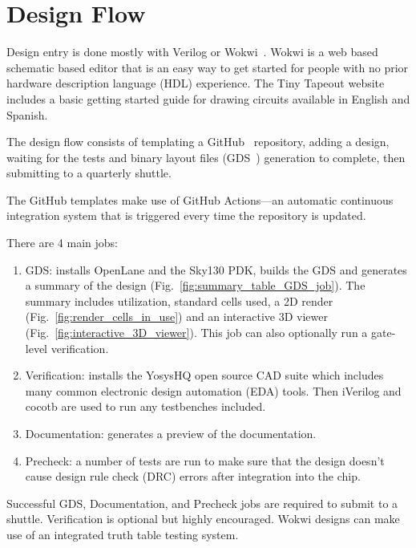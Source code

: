 \section{Design Flow}
\label{sec:design_flow}

Design entry is done mostly with Verilog or Wokwi~\cite{wokwi}.
Wokwi is a web based schematic based editor that is an easy way to get started for people with no prior hardware description language (HDL) experience.
The Tiny Tapeout website~\cite{tinytapeout} includes a basic getting started guide for drawing circuits available in English and Spanish.

The design flow consists of templating a GitHub~\cite{github} repository, adding a design, waiting for the tests and binary layout files (GDS~\cite{gds}) generation to complete, then submitting to a quarterly shuttle.

The GitHub templates\cite{verilogtemplate} make use of GitHub Actions\cite{githubactions}---an automatic continuous integration system that is triggered every time the repository is updated.

There are 4 main jobs:

\begin{enumerate}
	\item GDS: installs OpenLane\cite{openlane} and the Sky130\cite{skywaterpdk} PDK, builds the GDS and generates a summary of the design (Fig.~\ref{fig:summary_table_GDS_job}). The summary includes utilization, standard cells used, a 2D render (Fig.~\ref{fig:render_cells_in_use}) and an interactive 3D viewer (Fig.~\ref{fig:interactive_3D_viewer}).
This job can also optionally run a gate-level verification.
	\item Verification: installs the YosysHQ open source CAD suite which includes many common electronic design automation (EDA) tools.
Then iVerilog\cite{iverilog} and cocotb\cite{cocotb} are used to run any testbenches included.
	\item Documentation: generates a preview of the documentation.
	\item Precheck: a number of tests are run to make sure that the design doesn’t cause design rule check (DRC) errors after integration into the chip.
\end{enumerate}

Successful GDS, Documentation, and Precheck jobs are required to submit to a shuttle.
Verification is optional but highly encouraged. Wokwi designs can make use of an integrated truth table testing system\cite{automatedtesting}.

